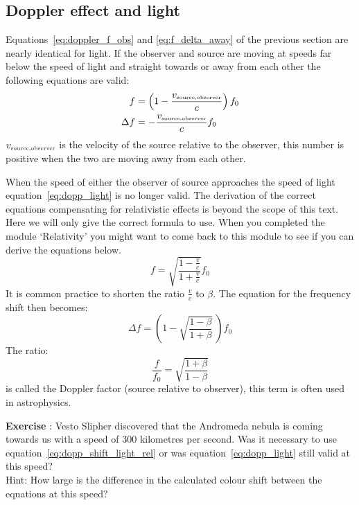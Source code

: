 \subsection{Doppler effect and light}
Equations~\ref{eq:doppler_f_obs} and \ref{eq:f_delta_away} of the previous section are nearly identical for light. If the observer and source are moving at speeds far below the speed of light and straight towards or away from each other the following equations are valid:
\begin{align}
f &= \left(1 - \frac{v_{\mbox{\begin{tiny}source,observer\end{tiny}}}}{c}\right) f_0 \\
\Delta f &= - \frac{v_{\mbox{\begin{tiny}source,observer\end{tiny}}}}{c} f_0 \label{eq:dopp_light} 
\end{align}
$v_{\mbox{\begin{tiny}source,observer\end{tiny}}}$ is the velocity of the source relative to the observer, this number is positive when the two are moving away from each other.

When the speed of either the observer of source approaches the speed of light equation~\ref{eq:dopp_light} is no longer valid. The derivation of the correct equations compensating for relativistic effects is beyond the scope of this text. Here we will only give the correct formula to use. When you completed the module `Relativity' you might want to come back to this module to see if you can derive the equations below.
\begin{equation}
f = \sqrt{\frac{1-\frac{v}{c}}{1+\frac{v}{c}}} f_0 \label{eq:dopp_light_rel} 
\end{equation}
It is common practice to shorten the ratio $\frac{v}{c}$ to $\beta$. The equation for the frequency shift then becomes:
\begin{equation}
\Delta f = \left( 1-\sqrt{\frac{1-\beta}{1+\beta}} ~\right)  f_0  \label{eq:dopp_shift_light_rel} 
\end{equation}
The ratio:
\begin{equation}
\frac{f}{f_0}= \sqrt{\frac{1+\beta}{1-\beta}} \label{eq:dopp_factor} 
\end{equation}
is called the Doppler factor (source relative to observer), this term is often used in astrophysics.

\begin{shaded}
\textbf{Exercise \theExercise {}} : Vesto Slipher discovered that the Andromeda nebula is coming towards us with a speed of 300 kilometres per second. Was it necessary to use equation~\ref{eq:dopp_shift_light_rel} or was equation~\ref{eq:dopp_light} still valid at this speed?\\
Hint: How large is the difference in the calculated colour shift between the equations at this speed?
\end{shaded}

